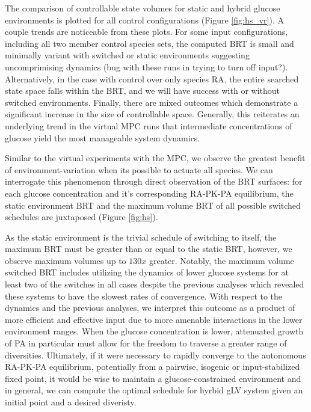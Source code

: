 \documentclass[twocolumn, 10pt]{report}
\begin{document}
{The comparison of controllable state volumes for static and hybrid glucose environments is plotted for all control configurations (Figure \ref{fig:hs_vr}). A couple trends are noticeable from these plots. For some input configurations, including all two member control species sets, the computed BRT is small and minimally variant with switched or static environments suggesting uncomprimising dynamics (bug with these runs in trying to turn off input?). Alternatively, in the case with control over only species RA, the entire searched state space falls within the BRT, and we will have success with or without switched environments. Finally, there are mixed outcomes which demonstrate a significant increase in the size of controllable space. Generally, this reiterates an underlying trend in the virtual MPC runs that intermediate concentrations of glucose yield the most manageable system dynamics.

Similar to the virtual experiments with the MPC, we observe the greatest benefit of environment-variation when its possible to actuate all species. We can interrogate this phenomenon through direct observation of the BRT surfaces: for each glucose concentration and it's corresponding RA-PK-PA equilibrium, the static environment BRT and the maximum volume BRT of all possible switched schedules are juxtaposed (Figure \ref{fig:hs}).

As the static environment is the trivial schedule of switching to itself, the maximum BRT must be greater than or equal to the static BRT, however, we observe maximum volumes up to $130x$ greater. Notably, the maximum volume switched BRT includes utilizing the dynamics of lower glucose systems for at least two of the switches in all cases despite the previous analyses which revealed these systems to have the slowest rates of convergence. With respect to the dynamics and the previous analyses, we interpret this outcome as a product of more efficient and effective input due to more amenable interactions in the lower environment ranges. When the glucose concentration is lower, attenuated growth of PA in particular must allow for the freedom to traverse a greater range of diversities. Ultimately, if it were necessary to rapidly converge to the autonomous RA-PK-PA equilibrium, potentially from a pairwise, isogenic or input-stabilized fixed point, it would be wise to maintain a glucose-constrained environment and in general, we can compute the optimal schedule for hyrbid gLV system given an initial point and a desired diveristy.

}
\end{document}
